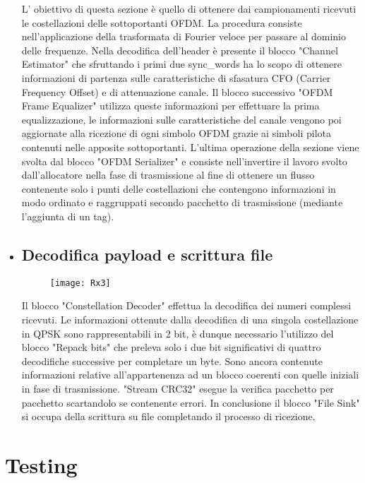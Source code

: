 \begin{itemize}
 	L' obiettivo di questa sezione è quello di ottenere dai campionamenti ricevuti le costellazioni delle sottoportanti OFDM. La procedura consiste nell'applicazione della trasformata di Fourier veloce per passare al dominio delle frequenze. Nella decodifica dell'header è presente il blocco "Channel Estimator" che sfruttando i primi due sync\_words ha lo scopo di ottenere informazioni di partenza sulle caratteristiche di sfasatura CFO (Carrier Frequency Offset) e di attenuazione canale. Il blocco successivo "OFDM Frame Equalizer" utilizza queste informazioni per effettuare la prima equalizzazione, le informazioni sulle caratteristiche del canale vengono poi aggiornate alla ricezione di ogni simbolo OFDM grazie ai simboli pilota contenuti nelle apposite sottoportanti. L'ultima operazione della sezione viene svolta dal blocco "OFDM Serializer" e consiste nell'invertire il lavoro svolto dall'allocatore nella fase di trasmissione al fine di ottenere un flusso contenente solo i punti delle costellazioni che contengono informazioni in modo ordinato e raggruppati secondo pacchetto di trasmissione (mediante l'aggiunta di un tag). 
 	
 	\item \subsection{Decodifica payload e scrittura file}
 	\begin{figure}[h]
 		\raggedleft
 		\texttt{[image: Rx3]}
 		\caption{}
 	\end{figure}
 	Il blocco "Constellation Decoder" effettua la decodifica dei numeri complessi ricevuti. Le informazioni ottenute dalla decodifica di una singola costellazione in QPSK sono rappresentabili in 2 bit, è dunque necessario l'utilizzo del blocco "Repack bits" che preleva solo i due bit significativi di quattro decodifiche successive per completare un byte. Sono ancora contenute informazioni relative all'appartenenza ad un blocco coerenti con quelle iniziali in fase di trasmissione. "Stream CRC32" esegue la verifica pacchetto per pacchetto scartandolo se contenente errori. In conclusione il blocco "File Sink" si occupa della scrittura su file completando il processo di ricezione.
 \end{itemize}
\section{Testing}
